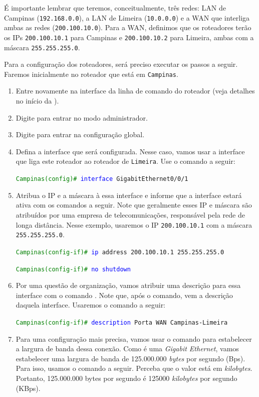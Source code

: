 É importante lembrar que teremos, conceitualmente, três redes: LAN de Campinas (\texttt{192.168.0.0}), a LAN de Limeira (\texttt{10.0.0.0}) e a WAN que interliga ambas as redes (\texttt{200.100.10.0}). Para a WAN, definimos que os roteadores terão os IPs \texttt{200.100.10.1} para Campinas e \texttt{200.100.10.2} para Limeira, ambas com a máscara \texttt{255.255.255.0}. 

Para a configuração dos roteadores, será preciso executar os passos a seguir. Faremos inicialmente no roteador que está em \texttt{Campinas}.
\begin{enumerate}[label*=\arabic*.]
  \item Entre novamente na interface da linha de comando do roteador (veja detalhes no início da ).
  \item Digite  para entrar no modo administrador. 
  \item Digite  para entrar na configuração global.
  \item Defina a interface que será configurada. Nesse caso, vamos usar a interface que liga este roteador ao roteador de \texttt{Limeira}. Use o comando a seguir:

    \texttt{\textcolor{green}{Campinas(config)\#} \textcolor{blue}{interface} GigabitEthernet0/0/1}
  
  \item Atribua o IP e a máscara à essa interface e informe que a interface estará ativa com os comandos a seguir. Note que geralmente esses IP e máscara são atribuídos por uma empresa de telecomunicações, responsável pela rede de longa distância. Nesse exemplo, usaremos o IP \texttt{200.100.10.1} com a máscara \texttt{255.255.255.0}.
    
       \texttt{\textcolor{green}{Campinas(config-if)\#} \textcolor{blue}{ip} address 200.100.10.1 255.255.255.0}

       \texttt{\textcolor{green}{Campinas(config-if)\#} \textcolor{blue}{no shutdown}}

   \item Por uma questão de organização, vamos atribuir uma descrição para essa interface com o comando . Note que, após o comando, vem a descrição daquela interface. Usaremos o comando a seguir:
    
       \texttt{\textcolor{green}{Campinas(config-if)\#} \textcolor{blue}{description} Porta WAN Campinas-Limeira}

   \item Para uma configuração mais precisa, vamos usar o comando  para estabelecer a largura de banda dessa conexão. Como é uma \textit{Gigabit Ethernet}, vamos estabelecer uma largura de banda de 125.000.000 \textit{bytes} por segundo (Bps). Para isso, usamos o comando a seguir. Perceba que o valor está em \textit{kilobytes}. Portanto, 125.000.000 bytes por segundo é 125000 \textit{kilobytes} por segundo (KBps).
   

\end{enumerate}
